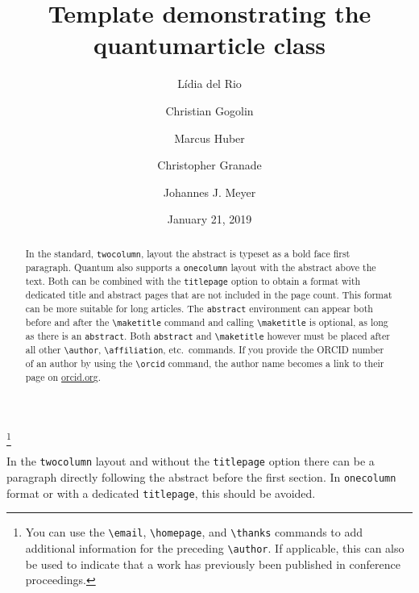 \documentclass[a4paper,twocolumn,superscriptaddress,11pt,accepted=2017-05-09]{quantumarticle}
\begin{document}
\title{Template demonstrating the quantumarticle class}
\date{January 21, 2019}
\author{Lídia del Rio}
\author{Christian Gogolin}
\thanks{You can use the \texttt{\textbackslash{}email}, \texttt{\textbackslash{}homepage}, and \texttt{\textbackslash{}thanks} commands to add additional information for the preceding \texttt{\textbackslash{}author}. If applicable, this can also be used to indicate that a work has previously been published in conference proceedings.}
\author{Marcus Huber}
\author{Christopher Granade}
\author{Johannes J. Meyer}
\maketitle

\begin{abstract}
  In the standard, \texttt{twocolumn}, layout the abstract is typeset as a bold face first paragraph.
  Quantum also supports a \texttt{onecolumn} layout with the abstract above the text.
  Both can be combined with the \texttt{titlepage} option to obtain a format with dedicated title and abstract pages that are not included in the page count.
  This format can be more suitable for long articles.
  The \texttt{abstract} environment can appear both before and after the \texttt{\textbackslash{}maketitle} command and calling \texttt{\textbackslash{}maketitle} is optional, as long as there is an \texttt{abstract}.
  Both \texttt{abstract} and \texttt{\textbackslash{}maketitle} however must be placed after all other \texttt{\textbackslash{}author}, \texttt{\textbackslash{}affiliation}, etc.\ commands.
  If you provide the ORCID number of an author by using the \texttt{\textbackslash{}orcid} command, the author name becomes a link to their page on \href{http://orcid.org/}{orcid.org}. 
\end{abstract}

In the \texttt{twocolumn} layout and without the \texttt{titlepage} option there can be a paragraph directly following the abstract before the first section.
In \texttt{onecolumn} format or with a dedicated \texttt{titlepage}, this should be avoided.
\end{document}
